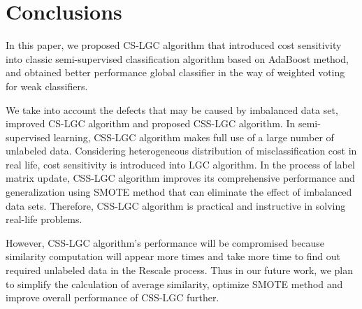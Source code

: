 \documentclass{svjour3}                     %
\begin{document}
\section{Conclusions}

In this paper, we proposed CS-LGC algorithm that introduced cost sensitivity into classic semi-supervised classification algorithm based on AdaBoost method, and obtained better performance
global classifier in the way of weighted voting for weak classifiers.

We take into account the defects that may be caused by imbalanced data set, improved CS-LGC
algorithm and proposed CSS-LGC algorithm. In semi-supervised learning, CSS-LGC algorithm makes full use of a large number of unlabeled data. Considering heterogeneous distribution of misclassification
cost in real life, cost sensitivity is introduced into LGC algorithm. In the process of label matrix update, CSS-LGC algorithm improves its comprehensive performance and generalization using SMOTE method that can eliminate the effect of imbalanced data sets. Therefore, CSS-LGC algorithm is practical and instructive in solving real-life problems.

However, CSS-LGC algorithm's performance will be compromised because similarity computation will appear more times and take more time to find out required unlabeled data in the Rescale process. Thus in our future work, we plan to simplify the calculation of average similarity, optimize SMOTE method and improve overall performance of CSS-LGC further.



\end{document}

